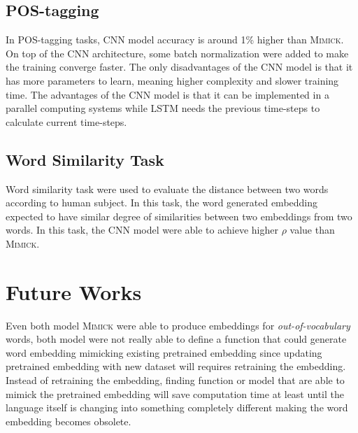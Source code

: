 \subsection{POS-tagging}
In POS-tagging tasks, CNN model accuracy is around 1\% higher than
\textsc{Mimick}. On top of the CNN architecture, some batch
normalization were added to make the training converge faster. The
only disadvantages of the CNN model is that it has more parameters
to learn, meaning higher complexity and slower training time. The
advantages of the CNN model is that it can be implemented in a
parallel computing systems while LSTM needs the previous time-steps to
calculate current time-steps.

\subsection{Word Similarity Task}
Word similarity task were used to evaluate the distance between two
words according to human subject. In this task, the word generated
embedding expected to have similar degree of similarities between two
embeddings from two words. In this task, the CNN model were able to
achieve higher $\rho$ value than \textsc{Mimick}.

\section{Future Works}
Even both model \textsc{Mimick} were able to produce embeddings for
\textit{out-of-vocabulary} words, both model were not really able to
define a function that could generate word embedding mimicking
existing pretrained embedding since updating pretrained embedding with
new dataset will requires retraining the embedding. Instead of
retraining the embedding, finding function or model that are able to
mimick the pretrained embedding will save computation time at least
until the language itself is changing into something completely
different making the word embedding becomes obsolete.